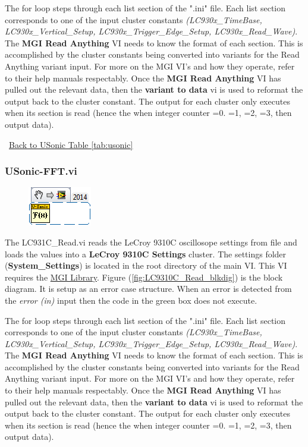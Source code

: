 \documentclass[11pt,a4paper,oldfontcommands]{memoir}
\begin{document}
The for loop steps through each list section of the ".ini" file. Each list section corresponds to one of the input cluster constants \textit{(LC930x\_TimeBase, LC930x\_Vertical\_Setup, LC930x\_Trigger\_Edge\_Setup, LC930x\_Read\_Wave)}. The \textbf{MGI Read Anything} VI needs to know the format of each section. This is accomplished by the cluster constants being converted into variants for the Read Anything variant input.  For more on the MGI VI's and how they operate, refer to their help manuals respectably. Once the \textbf{MGI Read Anything} VI has pulled out the relevant data, then the \textbf{variant to data} vi is used to reformat the output back to the cluster constant. The output for each cluster only executes when its section is read (hence the when integer counter =0. =1, =2, =3, then output data).

\noindent\hrulefill\, \hyperref[tab:usonic]{Back to USonic Table \ref{tab:usonic}}

\subsubsection{USonic-FFT.vi} \label{USonic-FFT}
\noindent\hrulefill

\begin{figure}[h]
	\includegraphics[scale=0.625]{USonic-FFT_main_01}
	\label{fig:USonic-FFT_main_01}
\end{figure}

The LC931C\_Read.vi reads the LeCroy 9310C oscillosope settings from file and loads the values into a \textbf{LeCroy 9310C Settings} cluster. The settings folder (\textbf{System\_Settings}) is located in the root directory of the main VI. This VI requires the \href{http://sine.ni.com/nips/cds/view/p/lang/en/nid/209753}{MGI Library}. Figure (\ref{fig:LC9310C_Read_blkdig}) is the block diagram.  It is setup as an error case structure. When an error is detected from the \textit{error (in)} input then the code in the green box does not execute.

The for loop steps through each list section of the ".ini" file. Each list section corresponds to one of the input cluster constants \textit{(LC930x\_TimeBase, LC930x\_Vertical\_Setup, LC930x\_Trigger\_Edge\_Setup, LC930x\_Read\_Wave)}. The \textbf{MGI Read Anything} VI needs to know the format of each section. This is accomplished by the cluster constants being converted into variants for the Read Anything variant input.  For more on the MGI VI's and how they operate, refer to their help manuals respectably. Once the \textbf{MGI Read Anything} VI has pulled out the relevant data, then the \textbf{variant to data} vi is used to reformat the output back to the cluster constant. The output for each cluster only executes when its section is read (hence the when integer counter =0. =1, =2, =3, then output data).
\end{document}
